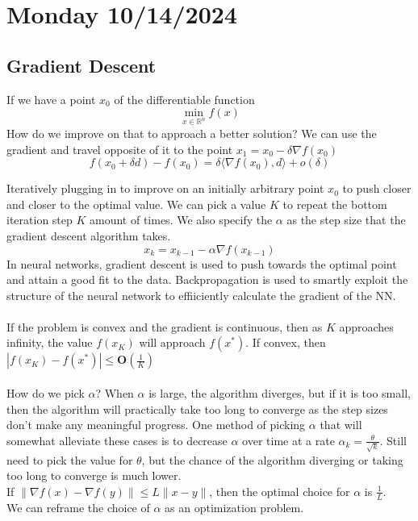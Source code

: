  \section{Monday 10/14/2024}
 \subsection{Gradient Descent}
 If we have a point $x_0$ of the differentiable function
 \begin{equation}
  \min_{x \in \mathbb{R}^n} f(x)
 \end{equation}
How do we improve on that to approach a better solution? We can use the gradient and travel opposite of it to the point $x_1 = x_0 - \delta \nabla f(x_0)$
\begin{equation}
  f(x_0 + \delta d) - f(x_0) = \delta \langle \nabla f(x_0), d \rangle + o(\delta)
\end{equation}

Iteratively plugging in to improve on an initially arbitrary point $x_0$ to push closer and closer to the optimal value. We can pick a value $K$ to repeat the bottom iteration step $K$ amount of times. We also specify the $\alpha$ as the step size that the gradient descent algorithm takes.
\begin{equation}
  x_k = x_{k-1} - \alpha \nabla f(x_{k-1})
\end{equation}
In neural networks, gradient descent is used to push towards the optimal point and attain a good fit to the data. Backpropagation is used to smartly exploit the structure of the neural network to effiiciently calculate the gradient of the NN. \\ \\
If the problem is convex and the gradient is continuous, then as $K$ approaches infinity, the value $f(x_K)$ will approach $f(x^*)$. If convex, then $|f(x_K) - f(x^*)| \leq \textbf{O}(\frac{1}{K})$ \\ \\
How do we pick $\alpha$? When $\alpha$ is large, the algorithm diverges, but if it is too small, then the algorithm will practically take too long to converge as the step sizes don't make any meaningful progress. One method of picking $\alpha$ that will somewhat alleviate these cases is to decrease $\alpha$ over time at a rate $\alpha_k = \frac{\theta}{\sqrt{k}}$. Still need to pick the value  for $\theta$, but the chance of the algorithm diverging or taking too long to converge is much lower. \\
If $\| \nabla f(x) - \nabla f(y) \| \leq L \| x - y \|$, then the optimal choice for $\alpha$ is $\frac{1}{L}$. \\
We can reframe the choice of $\alpha$ as an optimization problem.
